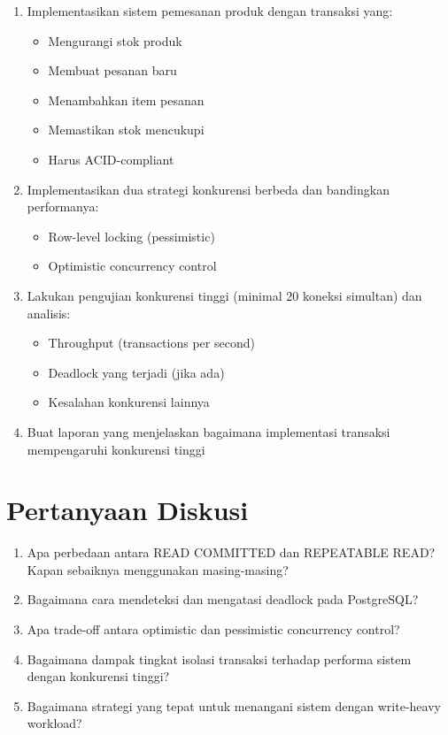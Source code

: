 \begin{enumerate}
    \item Implementasikan sistem pemesanan produk dengan transaksi yang:
    \begin{itemize}
        \item Mengurangi stok produk
        \item Membuat pesanan baru
        \item Menambahkan item pesanan
        \item Memastikan stok mencukupi
        \item Harus ACID-compliant
    \end{itemize}
    
    \item Implementasikan dua strategi konkurensi berbeda dan bandingkan performanya:
    \begin{itemize}
        \item Row-level locking (pessimistic)
        \item Optimistic concurrency control
    \end{itemize}
    
    \item Lakukan pengujian konkurensi tinggi (minimal 20 koneksi simultan) dan analisis:
    \begin{itemize}
        \item Throughput (transactions per second)
        \item Deadlock yang terjadi (jika ada)
        \item Kesalahan konkurensi lainnya
    \end{itemize}
    
    \item Buat laporan yang menjelaskan bagaimana implementasi transaksi mempengaruhi konkurensi tinggi
\end{enumerate}

\section{Pertanyaan Diskusi}

\begin{enumerate}
    \item Apa perbedaan antara READ COMMITTED dan REPEATABLE READ? Kapan sebaiknya menggunakan masing-masing?
    \item Bagaimana cara mendeteksi dan mengatasi deadlock pada PostgreSQL?
    \item Apa trade-off antara optimistic dan pessimistic concurrency control?
    \item Bagaimana dampak tingkat isolasi transaksi terhadap performa sistem dengan konkurensi tinggi?
    \item Bagaimana strategi yang tepat untuk menangani sistem dengan write-heavy workload?
\end{enumerate}

